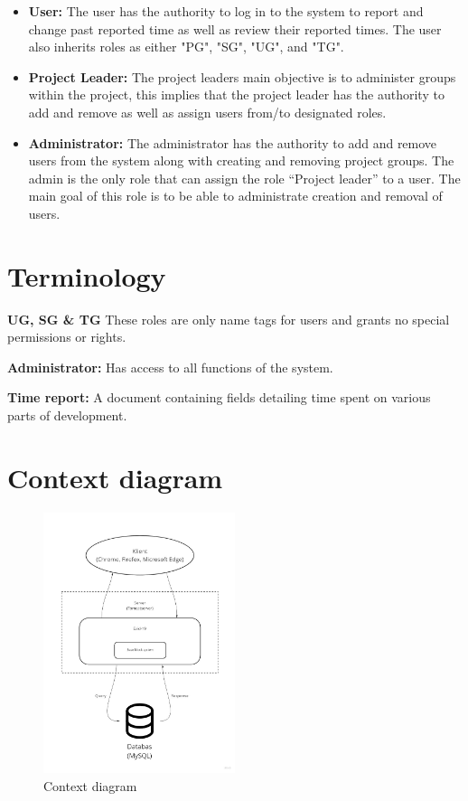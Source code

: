 \documentclass{article}
\begin{document}
\begin{itemize}
  \item \textbf{User:} The user has the authority to log in to the system to report and  change past reported time as well as review their reported times. The user also inherits roles as either "PG", "SG", "UG", and "TG".
  \item \textbf{Project Leader:}
  The project leaders main objective is to administer groups within the project, this implies that the project leader has the authority to add and remove as well as assign users from/to designated roles.
   \item \textbf{Administrator:} The administrator has the authority to add and remove users from the system along with creating and removing project groups. The admin is the only role that can assign the role “Project leader” to a user. The main goal of this role is to be able to administrate creation and removal of users.
\end{itemize}




\section{Terminology}

\item \textbf{UG, SG & TG} These roles are only name tags for users and grants no special permissions or rights.
\item \textbf{Administrator:} 
  Has access to all functions of the system.
\item \textbf{Time report:}
  A document containing fields detailing time spent on various parts of development.



\section{Context diagram}
\begin{figure}[ht]
\centering
\includegraphics[width=0.5\textwidth]{Flowchart_6.jpg}
\caption{Context diagram}
\end{figure}
\end{document}
